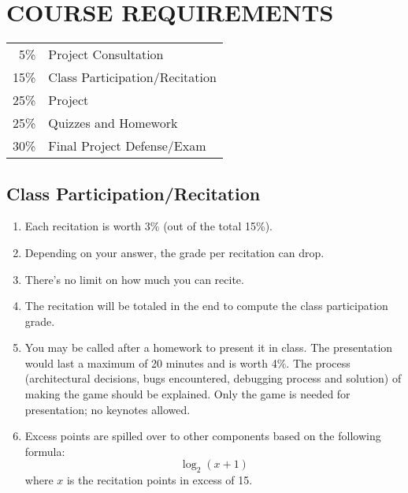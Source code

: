 \documentclass[10pt]{article}
\begin{document}
\section{COURSE REQUIREMENTS}
\begin{center}
\begin{tabular}{rl}
5\% & Project Consultation\\
15\% & Class Participation/Recitation\\
25\% & Project\\
25\% & Quizzes and Homework\\
30\% & Final Project Defense/Exam\\
\end{tabular}
\end{center}

\subsection{Class Participation/Recitation}
\begin{enumerate}[noitemsep]
\item Each recitation is worth 3\% (out of the total 15\%).
\item Depending on your answer, the grade per recitation can drop.
\item There's no limit on how much you can recite.
\item The recitation will be totaled in the end to compute the class participation grade.
\item You may be called after a homework to present it in class. The presentation would last a maximum of 20 minutes and is worth 4\%. The process (architectural decisions, bugs encountered, debugging process and solution) of making the game should be explained. Only the game is needed for presentation; no keynotes allowed.
\item Excess points are spilled over to other components based on the following formula:
$$
\log_2(x + 1)
$$
where $x$ is the recitation points in excess of 15.
\end{enumerate}
\end{document}
